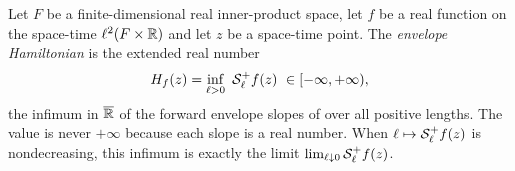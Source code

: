 \begin{definition}
Let $F$ be a finite-dimensional real inner-product space, let $f$ be a real
function on the space-time $\ell^2(F\times\mathbb{R})$ and let $z$ be a space-time
point. The \emph{envelope Hamiltonian} is the extended real number
\[
  H_f(z)=\inf_{\ell>0}\ \Senv_\ell^+f(z)\ \in[-\infty,+\infty),
\]
the infimum in $\overline{\mathbb{R}}$ of the forward envelope slopes of
 over all positive lengths. The value is never $+\infty$
because each slope is a real number. When $\ell\mapsto\mathcal{S}_\ell^+f(z)$ is
nondecreasing, this infimum is exactly the limit
$\lim_{\ell\downarrow0}\mathcal{S}_\ell^+f(z)$.
\end{definition}
